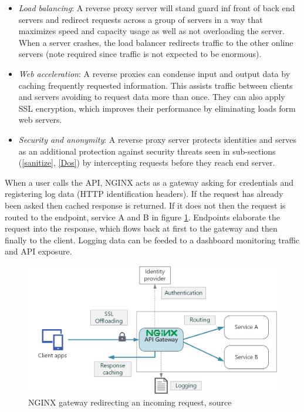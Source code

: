 \documentclass[
  12pt,
  a4paper,
  oneside]{book}
\theoremstyle{definition}
\theoremstyle{definition}
\theoremstyle{definition}
\theoremstyle{remark}
\begin{document}
\begin{itemize}
\item
  \emph{Load balancing}: A reverse proxy server will stand guard inf front of back end servers and redirect requests across a group of servers in a way that maximizes speed and capacity usage as well as not overloading the server. When a server crashes, the load balancer redirects traffic to the other online servers (note required since traffic is not expected to be enormous).
\item
  \emph{Web acceleration}: A reverse proxies can condense input and output data by caching frequently requested information. This assists traffic between clients and servers avoiding to request data more than once. They can also apply SSL encryption, which improves their performance by eliminating loads form web servers.
\item
  \emph{Security and anonymity}: A reverse proxy server protects identities and serves as an additional protection against security threats seen in sub-sections (\ref{sanitize}, \ref{Dos}) by intercepting requests before they reach end server.
\end{itemize}

When a user calls the API, NGINX acts as a gateway asking for credentials and registering log data (HTTP identification headers). If the request has already been asked then cached response is returned. If it does not then the request is routed to the endpoint, service A and B in figure \ref{fig:nginxfun}. Endpoints elaborate the request into the response, which flows back at first to the gateway and then finally to the client. Logging data can be feeded to a dashboard monitoring traffic and API exposure.

\begin{figure}
\centering
\includegraphics{images/nginx_gateway.png}
\caption{\label{fig:nginxfun}NGINX gateway redirecting an incoming request, source \citet{azureNGINX}}
\end{figure}
\end{document}
